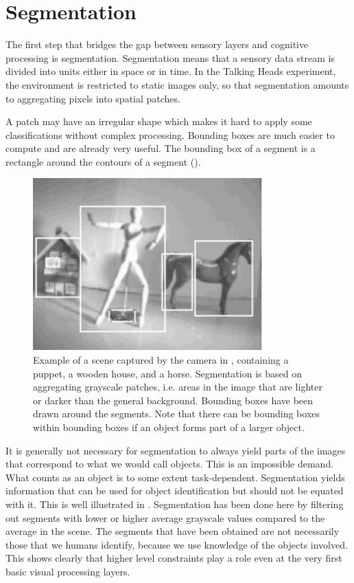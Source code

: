 \section{Segmentation} 

The first step that bridges the gap between sensory layers and 
cognitive processing is segmentation. Segmentation means that 
a sensory data stream is divided into units 
either in space or in time. In the Talking Heads experiment, 
the environment is restricted to
static images only, so that segmentation
amounts to aggregating pixels into spatial patches.

A patch may have an irregular shape which makes it hard to apply 
some classifications without complex processing. Bounding boxes are much 
easier to compute and are already very useful. The bounding box of a segment 
is a rectangle around the contours of a segment (). 

\begin{figure}[htbp]
  \centerline{\includegraphics[width=.50\textwidth]{chap3/figs/sslang}}
\label{screenshot}
\caption{ Example of a scene captured by the 
camera in , containing a puppet, a
wooden house, and a horse. Segmentation is based on aggregating grayscale
patches, i.e. areas in the image that are lighter or darker than the 
general background. Bounding boxes have been drawn around the segments. 
Note that there can be bounding boxes within bounding boxes if an object 
forms part of a larger object. 
\label{f:boundbox}}
\end{figure}

It is generally not necessary for segmentation to always yield parts of the images that correspond
to what we would call objects. This is an impossible demand. What counts as 
an object is to some extent task-dependent. 
Segmentation yields information that can be used for 
object identification but should not be equated with it. 
This is well illustrated in . 
Segmentation has been done here by filtering out segments with 
lower or higher average grayscale values compared to the 
average in the scene. The segments that have been obtained
are not necessarily those that we humans identify, because we
use knowledge of the objects involved. This 
shows clearly that higher level constraints play a role 
even at the very first basic visual processing layers. 

